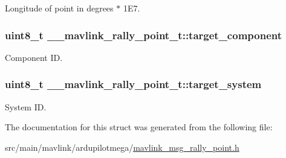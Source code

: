 Longitude of point in degrees $\ast$ 1\+E7. 

\hypertarget{struct____mavlink__rally__point__t_a5e2e50649ed29405428130dcc2ff2600}{
\subsubsection[{target\+\_\+component}]{\setlength{\rightskip}{0pt plus 5cm}uint8\+\_\+t \+\_\+\+\_\+mavlink\+\_\+rally\+\_\+point\+\_\+t\+::target\+\_\+component}}\label{struct____mavlink__rally__point__t_a5e2e50649ed29405428130dcc2ff2600}


Component I\+D. 

\hypertarget{struct____mavlink__rally__point__t_a1517222437188e579031c9ac9adb9376}{
\subsubsection[{target\+\_\+system}]{\setlength{\rightskip}{0pt plus 5cm}uint8\+\_\+t \+\_\+\+\_\+mavlink\+\_\+rally\+\_\+point\+\_\+t\+::target\+\_\+system}}\label{struct____mavlink__rally__point__t_a1517222437188e579031c9ac9adb9376}


System I\+D. 



The documentation for this struct was generated from the following file\+:\begin{DoxyCompactItemize}
\item 
src/main/mavlink/ardupilotmega/\hyperlink{mavlink__msg__rally__point_8h}{mavlink\+\_\+msg\+\_\+rally\+\_\+point.\+h}\end{DoxyCompactItemize}
